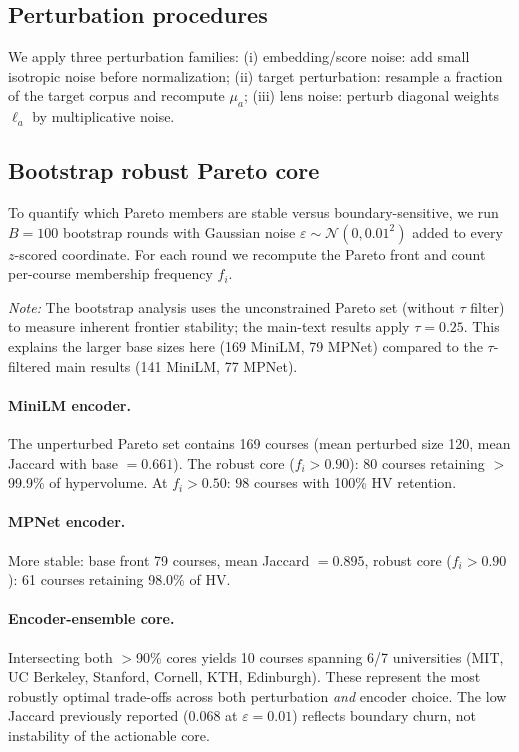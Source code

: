 \documentclass[sigconf,review]{acmart}
\newcommand{\MainParetoSize}{141}
\newcommand{\MPNetParetoSize}{77}
\begin{document}
\subsection{Perturbation procedures}
We apply three perturbation families:
(i) {embedding/score noise:} add small isotropic noise before normalization;
(ii) {target perturbation:} resample a fraction of the target corpus and recompute $\mu_a$;
(iii) {lens noise:} perturb diagonal weights $\ell_a$ by multiplicative noise.

\subsection{Bootstrap robust Pareto core}
To quantify which Pareto members are stable versus boundary-sensitive, we run $B = 100$ bootstrap rounds with Gaussian noise $\varepsilon \sim \mathcal{N}(0, 0.01^2)$ added to every $z$-scored coordinate. For each round we recompute the Pareto front and count per-course membership frequency $f_i$.

\textit{Note:} The bootstrap analysis uses the unconstrained Pareto set (without $\tau$ filter) to measure inherent frontier stability; the main-text results apply $\tau = 0.25$. This explains the larger base sizes here (169 MiniLM, 79 MPNet) compared to the $\tau$-filtered main results ({\MainParetoSize} MiniLM, {\MPNetParetoSize} MPNet).

\paragraph{MiniLM encoder.} The unperturbed Pareto set contains 169 courses (mean perturbed size 120, mean Jaccard with base $= 0.661$). The robust core ($f_i > 0.90$): 80 courses retaining $>$99.9\% of hypervolume. At $f_i > 0.50$: 98 courses with 100\% HV retention.

\paragraph{MPNet encoder.} More stable: base front 79 courses, mean Jaccard $= 0.895$, robust core ($f_i > 0.90$): 61 courses retaining 98.0\% of HV.

\paragraph{Encoder-ensemble core.} Intersecting both $>$90\% cores yields 10 courses spanning 6/7 universities (MIT, UC Berkeley, Stanford, Cornell, KTH, Edinburgh). These represent the most robustly optimal trade-offs across both perturbation \emph{and} encoder choice. The low Jaccard previously reported (0.068 at $\varepsilon = 0.01$) reflects boundary churn, not instability of the actionable core.
\end{document}
